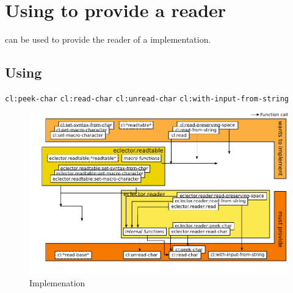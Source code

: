 \chapter{Using \sysname{} to provide a \commonlisp{} reader}

\sysname{} can be used to provide the reader of a \commonlisp{}
implementation.

\section{Using}

\texttt{cl:peek-char}
\texttt{cl:read-char}
\texttt{cl:unread-char}
\texttt{cl:with-input-from-string}

\begin{figure}
  \centering
  \includegraphics[angle=90]{figures/reader-implementation.pdf}
  \caption{Implemenation}
  \label{fig:reader-implementation}
\end{figure}

\newpage{}

